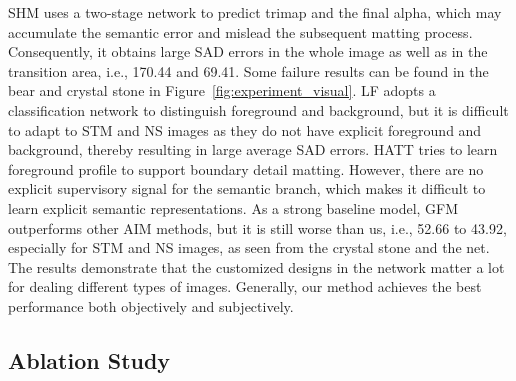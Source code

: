 \documentclass{article}
\begin{document}
SHM uses a two-stage network to predict trimap and the final alpha, which may accumulate the semantic error and mislead the subsequent matting process. Consequently, it obtains large SAD errors in the whole image as well as in the transition area, i.e., 170.44 and 69.41. Some failure results can be found in the bear and crystal stone in Figure~\ref{fig:experiment_visual}. LF adopts a classification network to distinguish foreground and background, but it is difficult to adapt to STM and NS images as they do not have explicit foreground and background, thereby resulting in large average SAD errors. HATT tries to learn foreground profile to support boundary detail matting. However, there are no explicit supervisory signal for the semantic branch, which makes it difficult to learn explicit semantic representations. As a strong baseline model, GFM outperforms other AIM methods, but it is still worse than us, i.e., 52.66 to 43.92, especially for STM and NS images, as seen from the crystal stone and the net. The results demonstrate that the customized designs in the network matter a lot for dealing different types of images. Generally, our method achieves the best performance both objectively and subjectively.


\subsection{Ablation Study}
\label{sec:ablation}

\begin{table}[t]
\begin{center}
\end{center}
\caption{Ablation study results. UNI: unified semantic representations; TL: transfer learning; MP: backbone with max pooling; SE: SE attention; SA: spatial attention.}
\label{tab:ablation}
\end{table}
\end{document}
